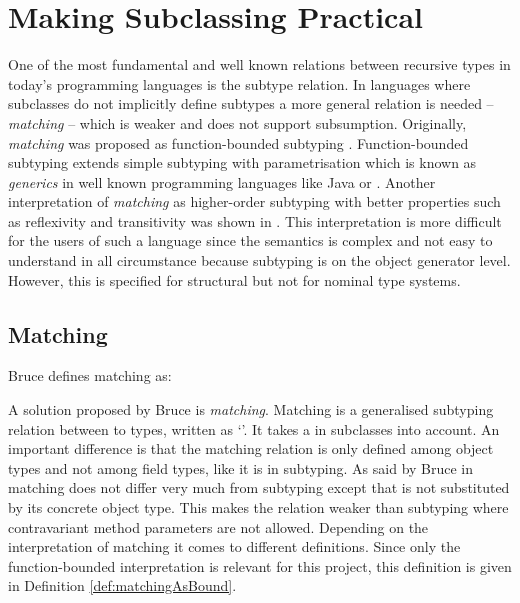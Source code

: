 \section{Making Subclassing Practical}
\label{ctr:makingSubclassingPractical}
One of the most fundamental and well known relations between recursive
types in today's programming languages is the subtype relation.
In languages where subclasses do not implicitly define subtypes a
more general relation is needed -- \emph{matching} -- which is weaker
and does not support subsumption. Originally, \emph{matching} was
proposed as function-bounded subtyping \cite{canning_f-bounded_1989}. Function-bounded
subtyping extends simple subtyping with parametrisation which
is known as \emph{generics} in well known programming languages
like Java or \cs \cite{barron-estrada_inheritance_2003}. Another
interpretation of \emph{matching} as higher-order subtyping with
better properties such as reflexivity and transitivity was shown in
\cite{abadi_subtyping_1996}. This interpretation is more difficult for
the users of such a language since the semantics is complex and not easy
to understand in all circumstance because subtyping is on the object
generator level. However, this is specified for structural but not for
nominal type systems.

\subsection{Matching}
\label{subsec:matching}
\begin{prop}[Matching]
	\label{prop:matching}
	Bruce defines matching as:
\end{prop}

A solution proposed by Bruce \cite{bruce_binary_1995} is
\emph{matching}. Matching is a generalised subtyping relation between to
types, written as `\match'. It takes a \mytype in subclasses into account.
An important difference is that the matching relation is only defined
among object types and not among field types, like it is in subtyping. As
said by Bruce in \cite{bruce_foundations_2002} matching does not differ
very much from subtyping except that \mytype is not substituted by its
concrete object type. This makes the relation weaker than subtyping
where contravariant method parameters are not allowed. Depending on the
interpretation of matching it comes to different definitions. Since
only the function-bounded interpretation is relevant for this project, this
definition is given in Definition \ref{def:matchingAsBound}.

